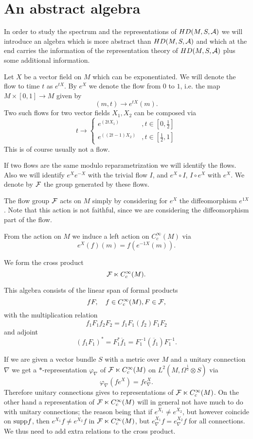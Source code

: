 \documentclass[12pt]{article}
\def\ca{{\cal A}}
\def\cf{{\cal F}}
\newcommand{\cF}{{\cal F}}
\begin{document}
\section{An abstract algebra}
In order to study the spectrum and the representations of $H D (M,S,\ca)   $ we will introduce an algebra which is more abstract than $H D (M,S,\ca)   $ and which at the end carries the information of the representation theory of $H D (M,S,\ca)   $ plus some additional information.  

Let $X$ be a vector field on $M$ which can be exponentiated. We will denote the flow to time $t$ as $e^{tX}$. By $e^X$ we denote the flow from $0$ to $1$, i.e. the map $ M\times [0,1] \to M   $ given by 
$$ (m,t)\to e^{tX} (m) .   $$
Two such flows for two vector fields $X_1,X_2$   can be composed via 
$$t \to \left\{ \begin{array}{cl} e^{(2t X_1)} &, t\in [0,\frac12 ]\\
e^{ ( (2t -1)X_2)}&,t \in [\frac12 , 1]
\end{array}    \right.$$
This is of course usually not a flow.  

If two flows are the same modulo reparametrization we will identify the flows. 
Also we will identify $e^Xe^{-X}$ with the trivial flow $I$, and $e^X \circ  I$, $I \circ e^X$ with $e^X$. We denote by $\cF$ the group generated by these flows. 

The flow group $\cf$ acts on $M$ simply by considering for $e^X$ the diffeomorphism $e^{1X}$. Note that this action is not faithful, since we are considering the diffeomorphism part of the flow. 

From the action on $M$ we induce a left action on $C^\infty_c(M)$ via
$$ e^X(f)(m)=f(e^{-1X}(m)) .  $$ 


We form the cross product
$$  \cF  \ltimes C^\infty_c (M). $$


 This algebra consists of the linear span of formal products 
$$ f F  , \quad f\in C^\infty_c (M), F\in \cF , $$ 
with the multiplication relation
$$f_1F_1 f_2 F_2=f_1 F_1 (f_2) F_1 F_2   $$
and adjoint
$$ (f_1 F_1)^*= F_1^*\overline{f}_1=F_1^{-1}(\overline{f}_1) F_1^{-1} .$$

If we are given a vector bundle $S$ with a metric over $M$ and a unitary connection $\nabla$ we get a $*$-representation $\varphi_\nabla$ of  $  \cF  \ltimes C^\infty_c (M) $ on $L^2(M,\Omega^{\frac12} \otimes S)   $ via 
$$\varphi_\nabla (fe^X )=fe^X_\nabla  .$$
Therefore unitary connections gives to representations of  $  \cF  \ltimes C^\infty_c (M) $. On the other hand a representation of $  \cF  \ltimes C^\infty_c (M) $ will in general not have much to do with unitary connections; the reason being that if $e^{X_1}\not= e^{X_2}$, but however coincide on $\hbox{supp}f$, then  $e^{X_1} f \not= e^{X_2} f$ in $\cF  \ltimes C^\infty_c (M)$, but $e^{X_1}_\nabla f = e^{X_2}_\nabla f$ for all connections.
%
We thus need to add extra relations to the cross product. 
\end{document}
